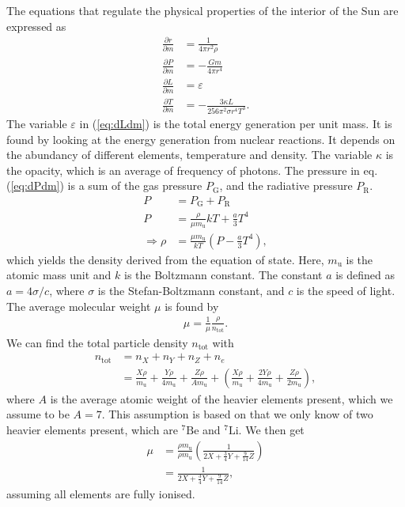 \documentclass[a4paper, 11pt, english]{article}
\newcommand{\refeq}[1]{(\textcolor{red}{\ref{eq:#1}})} %
\begin{document}
The equations that regulate the physical properties of the interior of the Sun are
expressed as
\begin{align}
	\frac{\partial r}{\partial m} &= \frac{1}{4\pi r^2 \rho} \label{eq:drdm} \\
	\frac{\partial P}{\partial m} &= -\frac{Gm}{4\pi r^4} \label{eq:dPdm} \\
	\frac{\partial L}{\partial m} &= \varepsilon \label{eq:dLdm} \\
	\frac{\partial T}{\partial m} &= -\frac{3 \kappa L}{256 \pi^2 \sigma r^4 T^3}. 
	\label{eq:dTdm} 
\end{align}
The variable $\varepsilon$ in \refeq{dLdm} is the total energy generation per unit mass.
It is found by looking at the energy generation from nuclear reactions. It depends on the
abundancy of different elements, temperature and density. The variable $\kappa$ is the
opacity, which is an average of frequency of photons.
The pressure in eq. \refeq{dPdm} is a sum of the gas pressure $P_{\mathrm{G}}$, and the radiative
pressure $P_{\mathrm{R}}$. 
\begin{align}
	P &= P_{\mathrm{G}} + P_{\mathrm{R}} \nonumber \\
	P &= \frac{\rho}{\mu m_{\mathrm{u}}} kT + \frac{a}{3}T^4 \nonumber \\
	\Rightarrow \rho &= \frac{\mu m_{\mathrm{u}}}{kT} \left( P - \frac{a}{3}T^4 \right),
	\label{eq:density}
\end{align}
which yields the density derived from the equation of state. Here, $m_{\mathrm{u}}$ is the
atomic mass unit and $k$ is the Boltzmann
constant. The constant $a$ is defined as $a = 4\sigma / c$, where $\sigma$ is the
Stefan-Boltzmann constant, and $c$ is the speed of light. The average molecular weight
$\mu$ is found by
\begin{align}
	\mu = \frac{1}{\mu}\frac{\rho}{n_{\mathrm{tot}}}.
	\label{eq:mu}
\end{align}
We can find the total particle density $n_{\mathrm{tot}}$ with
\begin{align*}
	n_{\mathrm{tot}} &= n_X + n_Y + n_Z + n_e \\
	&= \frac{X\rho}{m_{\mathrm{u}}} + \frac{Y\rho}{4m_{\mathrm{u}}} +
	\frac{Z\rho}{Am_{\mathrm{u}}} + \left( \frac{X\rho}{m_{\mathrm{u}}} +
	\frac{2Y\rho}{4m_{\mathrm{u}}} + \frac{Z\rho}{2m_{\mathrm{u}}} \right),
\end{align*}
where $A$ is the average atomic weight of the heavier elements present, which we assume to
be $A = 7$. This assumption is based on that we only know of two heavier elements present,
which are $^{7}\mathrm{Be}$ and $^{7}\mathrm{Li}$. We then get
\begin{align*}
	\mu &= \frac{\rho m_{\mathrm{u}}}{\rho m_{\mathrm{u}}} \left( \frac{1}{2X +
		\frac{3}{4}Y + \frac{9}{14}Z} \right) \\
		&= \frac{1}{2X +\frac{3}{4}Y + \frac{9}{14}Z},
\end{align*}
assuming all elements are fully ionised.
\end{document}

